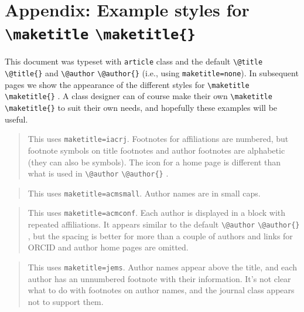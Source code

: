 \documentclass{article}
\newcommand{\cmd}[2][]{%
  \def\FirstArg{#1}%
  \ifx\FirstArg\empty%
    \texttt{\textbackslash{}#2}%
  \else%
    \texttt{\textbackslash{}#2\{#1\}}%
  \fi
}
\begin{document}
\section{Appendix: Example styles for \cmd{maketitle}\label{appendix}}
This document was typeset with \texttt{article} class and the
default \cmd{@title} and \cmd{@author} (i.e.,
using \texttt{maketitle=none}).  In subsequent pages we show the
appearance of the different styles for \cmd{maketitle}. A class designer can of
course make their own \cmd{maketitle} to suit their own needs, and hopefully these
examples will be useful.

\newpage
{}
\setcounter{footnote}{0}
\makeatletter
\METAC@iacrj@maketitle
\makeatother
\begin{quote}
This uses \texttt{maketitle=iacrj}. Footnotes for affiliations are numbered, but footnote symbols on
title footnotes and author footnotes are alphabetic (they can also be symbols). The icon for a home page
is different than what is used in \cmd{@author}.
\end{quote}
\label{iacrj}

\newpage
{}
\setcounter{footnote}{0}
\makeatletter
\METAC@acmsmall@maketitle
\makeatother
\begin{quote}
This uses \texttt{maketitle=acmsmall}. Author names are in small caps.
\end{quote}
\label{acmsmall}

\newpage
{}
\label{acmconf}
\setcounter{footnote}{0}
\savenotes
\makeatletter
\METAC@acmconf@maketitle
\makeatother
\spewnotes
\begin{quote}
This uses \texttt{maketitle=acmconf}. Each author is displayed in a block with repeated affiliations.
It appears similar to the default \cmd{@author}, but the spacing is better for more than a couple of
authors and links for ORCID and author home pages are omitted.
\end{quote}

\newpage
{}
\label{jems}
\setcounter{footnote}{0}
\makeatletter
\METAC@jems@maketitle
\makeatother
\begin{quote}
This uses \texttt{maketitle=jems}. Author names appear above the title, and each author has an unnumbered footnote with their
information. It's not clear what to do with footnotes on author names, and the journal class appears not to support
them.
\end{quote}
\end{document}
